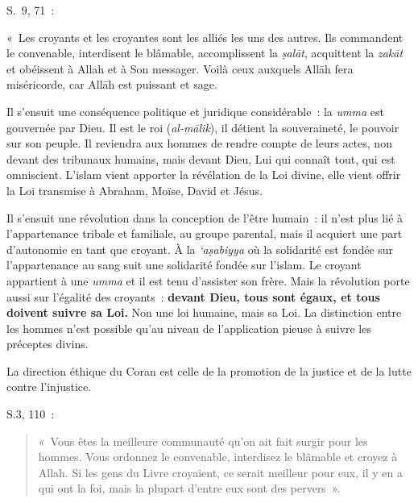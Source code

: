 S.~9, 71~:


«~Les croyants et les croyantes sont les alliés les uns des autres. Ils
commandent le convenable, interdisent le blâmable, accomplissent la
\emph{ṣalāt}, acquittent la \emph{zakāt} et obéissent à Allah et à Son
messager. Voilà ceux auxquels Allāh fera miséricorde, car Allāh est
puissant et sage.

Il s'ensuit une conséquence politique et juridique considérable~: la
\emph{umma} est gouvernée par Dieu. Il est le roi (\emph{al-mālik}), il
détient la souveraineté, le pouvoir sur son peuple. Il reviendra aux
hommes de rendre compte de leurs actes, non devant des tribunaux
humains, mais devant Dieu, Lui qui connaît tout, qui est omniscient.
L'islam vient apporter la révélation de la Loi divine, elle vient offrir
la Loi transmise à Abraham, Moïse, David et Jésus.

Il s'ensuit une révolution dans la conception de l'être humain~: il
n'est plus lié à l'appartenance tribale et familiale, au groupe
parental, mais il acquiert une part d'autonomie en tant que croyant. À
la \emph{`aṣabiyya} où la solidarité est fondée sur l'appartenance au
sang suit une solidarité fondée sur l'islam. Le croyant appartient à une
\emph{umma} et il est tenu d'assister son frère. Mais la révolution
porte aussi sur l'égalité des croyants~: \textbf{devant Dieu, tous sont
égaux, et tous doivent suivre sa Loi.} Non une loi humaine, mais sa Loi.
La distinction entre les hommes n'est possible qu'au niveau de
l'application pieuse à suivre les préceptes divins.

La direction éthique du Coran est celle de la promotion de la justice et
de la lutte contre l'injustice.

S.3, 110~:


\begin{quote}
«~Vous êtes la meilleure communauté qu'on ait fait surgir pour les
hommes. Vous ordonnez le convenable, interdisez le blâmable et croyez à
Allah. Si les gens du Livre croyaient, ce serait meilleur pour eux, il y
en a qui ont la foi, mais la plupart d'entre eux sont des pervers~».
\end{quote}

